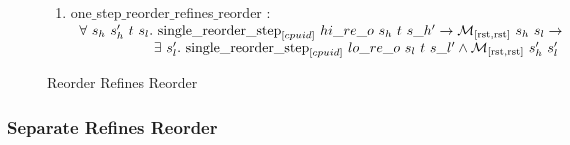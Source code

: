 \begin{figure}

\begin{enumerate}
\item one$\_$step$\_$reorder$\_$refines$\_$reorder : \\
$
\begin{array}{l}
\forall \ s_h \ s_h' \ t \ s_l . \ \singlereorderstep{cpuid}{hi\_re\_o}{s_h}{t}{s\_h'} \rightarrow \matchrrstaterrstae{s_h}{s_l} \rightarrow \\
\ \ \ \ \ \ \ \ \ \ \ \ \ \ \ \ \exists\ s_l' . \  \singlereorderstep{cpuid}{lo\_re\_o}{s_l}{t}{s\_l'} \wedge  \matchrrstaterrstae{s_h'}{s_l'}\\
\end{array}
$
\end{enumerate}

\caption{Reorder Refines Reorder}
\label{fig:reorder-refines-reorder}
\end{figure}


\clearpage

\subsubsection{Separate Refines Reorder}
\label{subsubsec:separate-refines-reorder}

